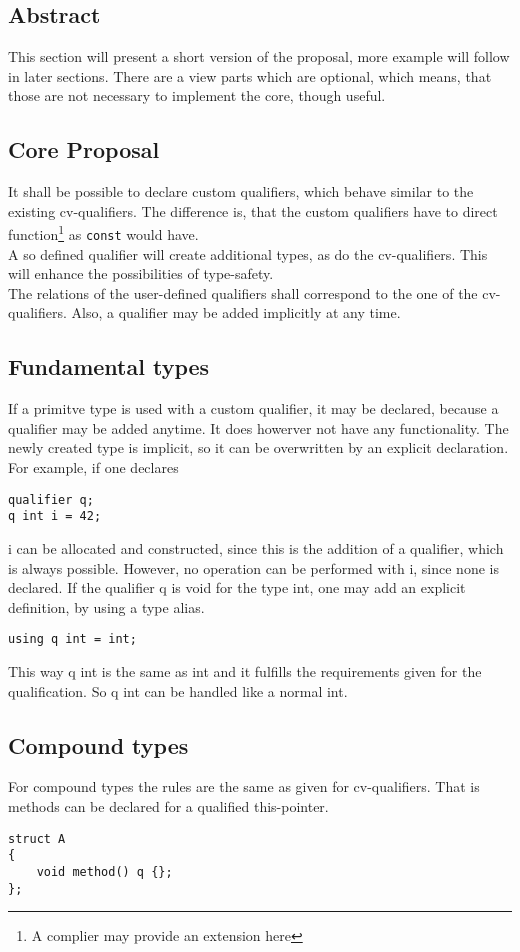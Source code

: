 \subsection*{Abstract}
This section will present a short version of the proposal, more example will follow in later sections. There are a view parts which are optional, which means, that those are not necessary to implement the core, though useful.
\subsection{Core Proposal} \label{prop:core}
It shall be possible to declare custom qualifiers, which behave similar to the existing cv-qualifiers. The difference is, that the custom qualifiers have to direct function\footnote{A complier may provide an extension here} as \lstinline {const} would have.\\
A so defined qualifier will create additional types, as do the cv-qualifiers. This will enhance the possibilities of type-safety.\\
The relations of the user-defined qualifiers shall correspond to the one of the cv-qualifiers. Also, a qualifier may be added implicitly at any time.
\subsection{Fundamental types}
If a primitve type is used with a custom qualifier, it may be declared, because a qualifier may be added anytime. It does howerver not have any functionality. The newly created type is implicit, so it can be overwritten by an explicit declaration.\\ 
For example, if one declares
\begin{lstlisting}
qualifier q;
q int i = 42;
\end{lstlisting}  
i can be allocated and constructed, since this is the addition of a qualifier, which is always possible. However, no operation can be performed with i, since none is declared. If the qualifier q is void for the type int, one may add an explicit definition, by using a type alias.
\begin{lstlisting}[firstnumber=3]
using q int = int;
\end{lstlisting}
This way q int is the same as int and it fulfills the requirements given for the qualification. So q int can be handled like a normal int.
\subsection{Compound types}
For compound types the rules are the same as given for cv-qualifiers. That is methods can be declared for a qualified this-pointer.
\begin{lstlisting}[firstnumber=4]
struct A
{
	void method() q {};
};
\end{lstlisting}

